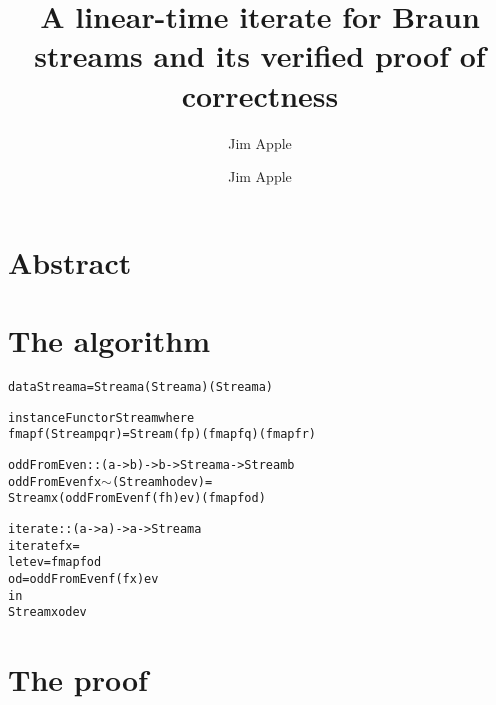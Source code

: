 \documentclass{article}
\author{Jim Apple}
\begin{document}
\title{A linear-time iterate for Braun streams and its verified proof of correctness}

\author{Jim Apple}

\maketitle

\section*{Abstract}

\cite{HinzePat}

\section{The algorithm}

\begin{alltt}
data Stream a = Stream a (Stream a) (Stream a) 

instance Functor Stream where
    fmap f (Stream p q r) = Stream (f p) (fmap f q) (fmap f r)

oddFromEven :: (a -> b) -> b -> Stream a -> Stream b
oddFromEven f x  \(\sim\)(Stream h od ev) =
    Stream x (oddFromEven f (f h) ev) (fmap f od)

iterate :: (a -> a) -> a -> Stream a
iterate f x =
    let ev = fmap f od
        od = oddFromEven f (f x) ev
    in
      Stream x od ev
\end{alltt}

\section{The proof}
\end{document}
